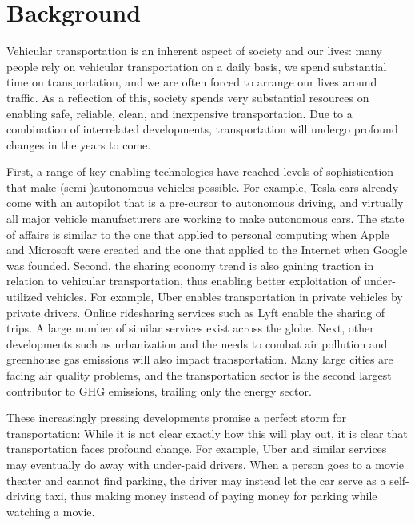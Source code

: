 \documentclass[11pt]{article}
\begin{document}
\section{Background}

Vehicular transportation is an inherent aspect of society and our lives: many people rely on vehicular transportation on a daily basis, we spend substantial time on transportation, and we are often forced to arrange our lives around traffic. As a reflection of this, society spends very substantial resources on enabling safe, reliable, clean, and inexpensive transportation. Due to a combination of interrelated developments, transportation will undergo profound changes in the years to come.

First, a range of key enabling technologies have reached levels of sophistication that make (semi-)autonomous vehicles possible. For example, Tesla cars already come with an autopilot that is a pre-cursor to autonomous driving, and virtually all major vehicle manufacturers are working to make autonomous cars. The state of affairs is similar to the one that applied to personal computing when Apple and Microsoft were created and the one that applied to the Internet when Google was founded. Second, the sharing economy trend is also gaining traction in relation to vehicular transportation, thus enabling better exploitation of under-utilized vehicles. For example, Uber enables transportation in private vehicles by private drivers. Online ridesharing services such as Lyft enable the sharing of trips. A large number of similar services exist across the globe. Next, other developments such as urbanization and the needs to combat air pollution and greenhouse gas emissions will also impact transportation. Many large cities are facing air quality problems, and the transportation sector is the second largest contributor to GHG emissions, trailing only the energy sector.

These increasingly pressing developments promise a perfect storm for transportation: While it is not clear exactly how this will play out, it is clear that transportation faces profound change. For example, Uber and similar services may eventually do away with under-paid drivers. When a person goes to a movie theater and cannot find parking, the driver may instead let the car serve as a self-driving taxi, thus making money instead of paying money for parking while watching a movie.
\end{document}
